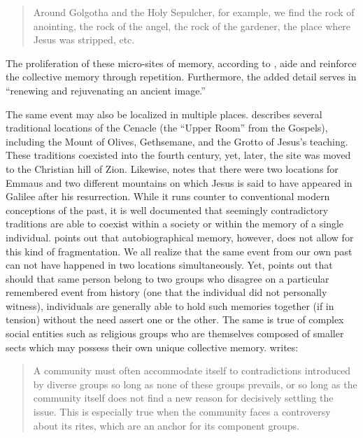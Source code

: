 \begin{quote}
    Around Golgotha and the Holy Sepulcher, for example, we find the rock of anointing, the rock of the angel, the rock of the gardener, the place where Jesus was stripped, etc.%
        \autocite[220]{halbwachs1992}
\end{quote}  
\noindent
The proliferation of these micro-sites of memory, according to \halbwachs, aide and reinforce the collective memory through repetition. Furthermore, the added detail serves in ``renewing and rejuvenating an ancient image.''%
    \autocite[220]{halbwachs1992}  

The same event may also be localized in multiple places. \halbwachs describes several traditional locations of the Cenacle (the ``Upper Room'' from the Gospels), including the Mount of Olives, Gethsemane, and the Grotto of Jesus's teaching. These traditions coexisted into the fourth century, yet, later, the site was moved to the Christian hill of Zion. Likewise, \halbwachs notes that there were two locations for Emmaus and two different mountains on which Jesus is said to have appeared in Galilee after his resurrection. While it runs counter to conventional modern conceptions of the past, it is well documented that seemingly contradictory traditions are able to coexist within a society or within the memory of a single individual.
\halbwachs points out that autobiographical memory, however, does not allow for this kind of fragmentation.
We all realize that the same event from our own past can not have happened in two locations simultaneously. Yet, \halbwachs points out that should that same person belong to two groups who disagree on a particular remembered event from history (one that the individual did not personally witness), individuals are generally able to hold such memories together (if in tension) without the need assert one or the other. The same is true of complex social entities such as religious groups who are themselves composed of smaller sects which may possess their own unique collective memory. \halbwachs writes:  

\begin{quote}
    A community must often accommodate itself to contradictions introduced by diverse groups so long as none of these groups prevails, or so long as the community itself does not find a new reason for decisively settling the issue. This is especially true when the community faces a controversy about its rites, which are an anchor for its component groups.%
        \autocite[224]{halbwachs1992}
\end{quote} 

